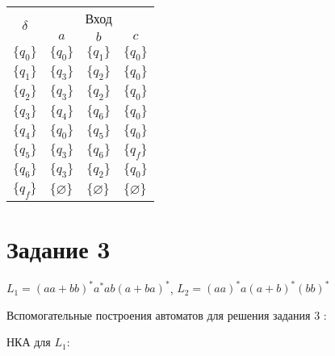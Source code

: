\begin{enumerate}[label=(\roman{*})]
\begin{enumerate}
		\begin{center}
			\begin{tabular}{llll}
				\toprule
				\multicolumn{1}{c}{\multirow{2}{*}{\Large $\delta$}}
				& \multicolumn{3}{c}{Вход} \\
				\cmidrule(rl){2-4}
				& \multicolumn{1}{c}{$a$}
				& \multicolumn{1}{c}{$b$} 
				& \multicolumn{1}{c}{$c$} \\
				\midrule
				$\{q_0\}$       & $\{q_0\}$      		 & $\{q_1\}$     &$\{q_0\}$  \\
				$\{q_1\}$       & $\{q_3\}$    			 & $\{q_2\}$     &$\{q_0\}$ \\
				$\{q_2\}$       & $\{q_3\}$    			 & $\{q_2\}$     &$\{q_0\}$  \\
				$\{q_3\}$       & $\{q_4\}$    			 & $\{q_6\}$     &$\{q_0\}$  \\
				$\{q_4\}$       & $\{q_0\}$    			 & $\{q_5\}$     &$\{q_0\}$  \\
				$\{q_5\}$       & $\{q_3\}$    			 & $\{q_6\}$     &$\{q_f\}$  \\
				$\{q_6\}$       & $\{q_3\}$    			 & $\{q_2\}$     &$\{q_0\}$ \\
				$\{q_f\}$       & $\{\varnothing\}$    	 & $\{\varnothing\}$     &$\{\varnothing\}$  \\
				\bottomrule
			\end{tabular}
		\end{center}
		
	\end{enumerate}
\end{enumerate}

\newpage
\section*{Задание 3}
$L_1 = (aa + bb)^*a^*ab(a + ba)^*$, $L_2 = (aa)^*a(a + b)^*(bb)^*$
\newline
	
	Вспомогательные построения автоматов для решения задания 3 :
	\newline
	
	НКА для $L_1$:
	
